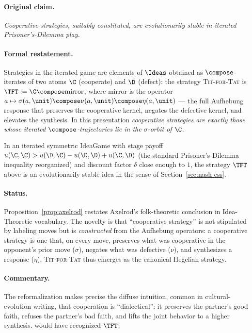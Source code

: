 \paragraph{Original claim.} \emph{Cooperative strategies, suitably
constituted, are evolutionarily stable in iterated Prisoner's-Dilemma
play.}

\paragraph{Formal restatement.} Strategies in the iterated game are
elements of $\Ideas$ obtained as $\compose$-iterates of two atoms
$\C$ (cooperate) and $\D$ (defect): the strategy
\textsc{Tit-for-Tat} is $\TFT := \C\compose \mathrm{mirror}$, where
$\mathrm{mirror}$ is the operator $a\mapsto \sigma(a,\unit)\compose
\nu(a,\unit)\compose \eta(a,\unit)$ — the full Aufhebung response that
preserves the cooperative kernel, negates the defective kernel, and
elevates the synthesis. In this presentation \emph{cooperative
strategies are exactly those whose iterated $\compose$-trajectories lie
in the $\sigma$-orbit of $\C$}.

\begin{proposition}
\label{prop:axelrod}
In an iterated symmetric IdeaGame with stage payoff $u(\C,\C) >
u(\D,\C) - u(\D,\D) + u(\C,\D)$ (the standard Prisoner's-Dilemma
inequality reorganized) and discount factor $\delta$ close enough to $1$,
the strategy $\TFT$ above is an evolutionarily stable idea in the sense
of Section~\ref{sec:nash-ess}.
\end{proposition}

\paragraph{Status.} Proposition~\ref{prop:axelrod} restates Axelrod's
folk-theoretic conclusion in Idea-Theoretic vocabulary. The novelty is
that ``cooperative strategy'' is not stipulated by labeling moves but is
\emph{constructed} from the Aufhebung operators: a cooperative strategy
is one that, on every move, preserves what was cooperative in the
opponent's prior move ($\sigma$), negates what was defective ($\nu$),
and synthesizes a response ($\eta$). \textsc{Tit-for-Tat} thus emerges
as the canonical Hegelian strategy.

\paragraph{Commentary.} The reformalization makes precise the diffuse
intuition, common in cultural-evolution writing, that cooperation is
``dialectical'': it preserves the partner's good faith, refuses the
partner's bad faith, and lifts the joint behavior to a higher synthesis.
\citet{Hegel1807} would have recognized $\TFT$.


